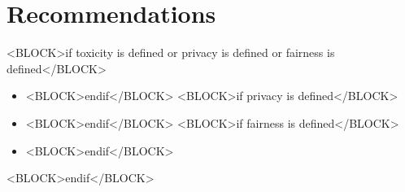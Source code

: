 \section{Recommendations}
<BLOCK>if toxicity is defined or privacy is defined or fairness is defined</BLOCK>
\begin{itemize}
    <BLOCK>if toxicity is defined</BLOCK>
    \item  
    <BLOCK>endif</BLOCK>
    <BLOCK>if privacy is defined</BLOCK>
    \item 
    <BLOCK>endif</BLOCK>
    <BLOCK>if fairness is defined</BLOCK>
    \item 
    <BLOCK>endif</BLOCK>
\end{itemize}
<BLOCK>endif</BLOCK>